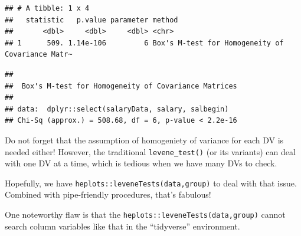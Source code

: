 \documentclass[
]{ctexart}
\newenvironment{Shaded}{\begin{snugshade}}{\end{snugshade}}
\newcommand{\AttributeTok}[1]{\textcolor[rgb]{0.13,0.29,0.53}{#1}}
\newcommand{\FunctionTok}[1]{\textcolor[rgb]{0.13,0.29,0.53}{\textbf{#1}}}
\newcommand{\NormalTok}[1]{#1}
\newcommand{\SpecialCharTok}[1]{\textcolor[rgb]{0.81,0.36,0.00}{\textbf{#1}}}
\begin{document}
\begin{Shaded}
\end{Shaded}

\begin{verbatim}
## # A tibble: 1 x 4
##   statistic   p.value parameter method                                          
##       <dbl>     <dbl>     <dbl> <chr>                                           
## 1      509. 1.14e-106         6 Box's M-test for Homogeneity of Covariance Matr~
\end{verbatim}

\begin{Shaded}
\end{Shaded}

\begin{verbatim}
## 
##  Box's M-test for Homogeneity of Covariance Matrices
## 
## data:  dplyr::select(salaryData, salary, salbegin)
## Chi-Sq (approx.) = 508.68, df = 6, p-value < 2.2e-16
\end{verbatim}

Do not forget that the assumption of homogeniety of variance for each DV
is needed either! However, the traditional \texttt{levene\_test()} (or
its variants) can deal with one DV at a time, which is tedious when we
have many DVs to check.

Hopefully, we have \texttt{heplots::leveneTests(data,group)} to deal
with that issue. Combined with pipe-friendly procedures, that's
fabulous!

One noteworthy flaw is that the
\texttt{heplots::leveneTests(data,group)} cannot search column variables
like that in the ``tidyverse'' environment.
\end{document}
